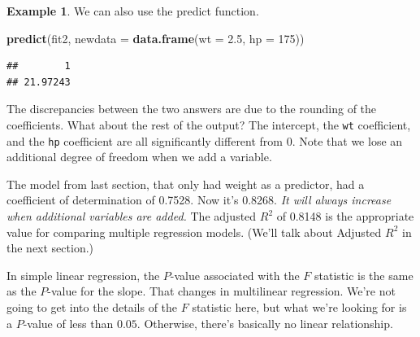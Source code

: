 \documentclass[
]{book}
\newenvironment{Shaded}{\begin{snugshade}}{\end{snugshade}}
\newcommand{\AttributeTok}[1]{\textcolor[rgb]{0.13,0.29,0.53}{#1}}
\newcommand{\DecValTok}[1]{\textcolor[rgb]{0.00,0.00,0.81}{#1}}
\newcommand{\FloatTok}[1]{\textcolor[rgb]{0.00,0.00,0.81}{#1}}
\newcommand{\FunctionTok}[1]{\textcolor[rgb]{0.13,0.29,0.53}{\textbf{#1}}}
\newcommand{\NormalTok}[1]{#1}
\theoremstyle{definition}
\theoremstyle{definition}
\newtheorem{example}{Example}[chapter]
\theoremstyle{definition}
\theoremstyle{definition}
\theoremstyle{remark}
\begin{document}
\begin{examplebox}
\begin{example}
We can also use the predict function.

\begin{Shaded}
\begin{Highlighting}[]
\FunctionTok{predict}\NormalTok{(fit2, }\AttributeTok{newdata =} \FunctionTok{data.frame}\NormalTok{(}\AttributeTok{wt =} \FloatTok{2.5}\NormalTok{, }\AttributeTok{hp =} \DecValTok{175}\NormalTok{))}
\end{Highlighting}
\end{Shaded}

\begin{verbatim}
##        1 
## 21.97243
\end{verbatim}

The discrepancies between the two answers are due to the rounding of the coefficients. What about the rest of the output? The intercept, the \texttt{wt} coefficient, and the \texttt{hp} coefficient are all significantly different from 0. Note that we lose an additional degree of freedom when we add a variable.

The model from last section, that only had weight as a predictor, had a coefficient of determination of 0.7528. Now it's 0.8268. \emph{It will always increase when additional variables are added.} The adjusted \(R^2\) of 0.8148 is the appropriate value for comparing multiple regression models. (We'll talk about Adjusted \(R^2\) in the next section.)

In simple linear regression, the \(P\)-value associated with the \(F\) statistic is the same as the \(P\)-value for the slope. That changes in multilinear regression. We're not going to get into the details of the \(F\) statistic here, but what we're looking for is a \(P\)-value of less than \(0.05\). Otherwise, there's basically no linear relationship.
\end{example}

\end{examplebox}
\end{document}
